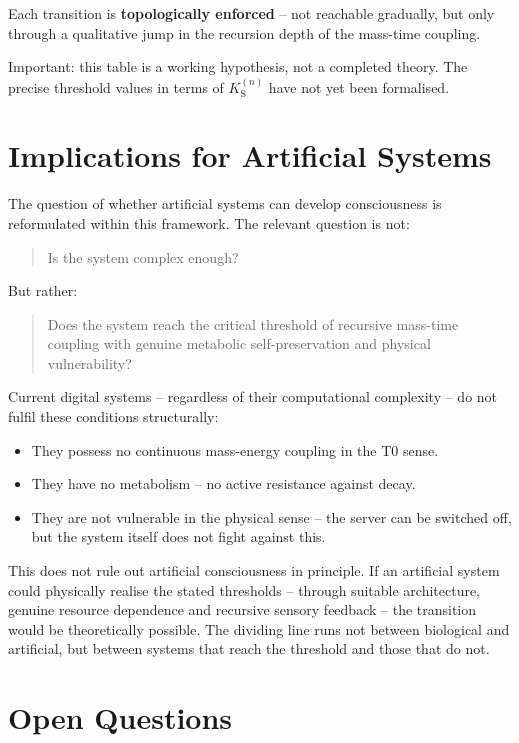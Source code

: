 	Each transition is \textbf{topologically enforced} -- not reachable gradually, but only through a qualitative jump in the recursion depth of the mass-time coupling.
	
	Important: this table is a working hypothesis, not a completed theory. The precise threshold values in terms of $K_{\text{S}}^{(n)}$ have not yet been formalised.
	
	\section{Implications for Artificial Systems}
	
	The question of whether artificial systems can develop consciousness is reformulated within this framework. The relevant question is not:
	\begin{quote}
		Is the system complex enough?
	\end{quote}
	But rather:
	\begin{quote}
		Does the system reach the critical threshold of recursive mass-time coupling with genuine metabolic self-preservation and physical vulnerability?
	\end{quote}
	
	Current digital systems -- regardless of their computational complexity -- do not fulfil these conditions structurally:
	\begin{itemize}
		\item They possess no continuous mass-energy coupling in the T0 sense.
		\item They have no metabolism -- no active resistance against decay.
		\item They are not vulnerable in the physical sense -- the server can be switched off, but the system itself does not fight against this.
	\end{itemize}
	
	This does not rule out artificial consciousness in principle. If an artificial system could physically realise the stated thresholds -- through suitable architecture, genuine resource dependence and recursive sensory feedback -- the transition would be theoretically possible. The dividing line runs not between biological and artificial, but between systems that reach the threshold and those that do not.
	
	\section{Open Questions}
	
